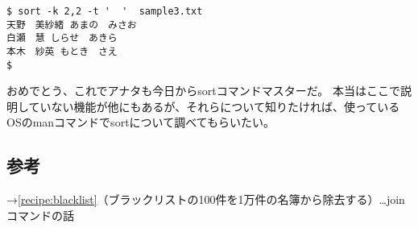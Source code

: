 \begin{screen}
	\verb!$ sort -k 2,2 -t '  '  sample3.txt! \return \\
	\verb!天野　美紗緒 あまの　みさお! \\
	\verb!白瀬　慧 しらせ　あきら! \\
	\verb!本木　紗英 もとき　さえ! \\
	\verb!$ !
\end{screen}

おめでとう、これでアナタも今日からsortコマンドマスターだ。
本当はここで説明していない機能が他にもあるが、それらについて知りたければ、使っているOSのmanコマンドでsortについて調べてもらいたい。

\subsection*{参考}

\noindent
→\ref{recipe:blacklist}（ブラックリストの100件を1万件の名簿から除去する）…joinコマンドの話